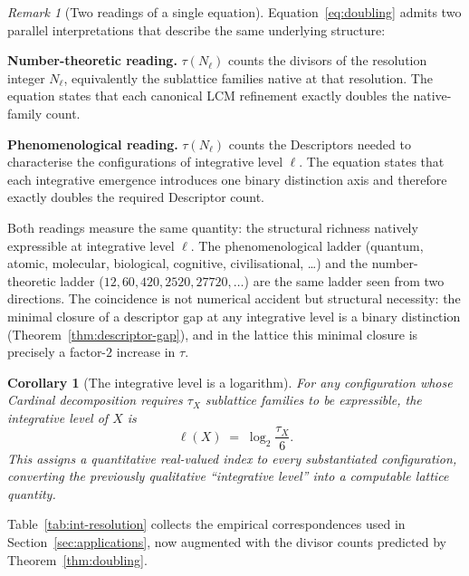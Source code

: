 \documentclass[11pt,a4paper]{article}
\newtheorem{corollary}[theorem]{Corollary}
\theoremstyle{definition}
\theoremstyle{remark}
\newtheorem{remark}[theorem]{Remark}
\begin{document}
\begin{remark}[Two readings of a single equation]\label{rem:two-readings}
Equation~\eqref{eq:doubling} admits two parallel interpretations that describe the same underlying structure:

\textbf{Number-theoretic reading.} $\tau(N_{\ell})$ counts the divisors of the resolution integer $N_{\ell}$, equivalently the sublattice families native at that resolution. The equation states that each canonical LCM refinement exactly doubles the native-family count.

\textbf{Phenomenological reading.} $\tau(N_{\ell})$ counts the Descriptors needed to characterise the configurations of integrative level $\ell$. The equation states that each integrative emergence introduces one binary distinction axis and therefore exactly doubles the required Descriptor count.

Both readings measure the same quantity: the structural richness natively expressible at integrative level $\ell$. The phenomenological ladder (quantum, atomic, molecular, biological, cognitive, civilisational, \ldots) and the number-theoretic ladder ($12, 60, 420, 2520, 27720, \ldots$) are the same ladder seen from two directions. The coincidence is not numerical accident but structural necessity: the minimal closure of a descriptor gap at any integrative level is a binary distinction (Theorem~\ref{thm:descriptor-gap}), and in the lattice this minimal closure is precisely a factor-$2$ increase in $\tau$.
\end{remark}

\begin{corollary}[The integrative level is a logarithm]\label{cor:level-log}
For any configuration whose Cardinal decomposition requires $\tau_{X}$ sublattice families to be expressible, the integrative level of $X$ is
\[
\ell(X) \;=\; \log_{2}\!\frac{\tau_{X}}{6}.
\]
This assigns a quantitative real-valued index to every substantiated configuration, converting the previously qualitative ``integrative level'' into a computable lattice quantity.
\end{corollary}

Table~\ref{tab:int-resolution} collects the empirical correspondences used in Section~\ref{sec:applications}, now augmented with the divisor counts predicted by Theorem~\ref{thm:doubling}.
\end{document}
